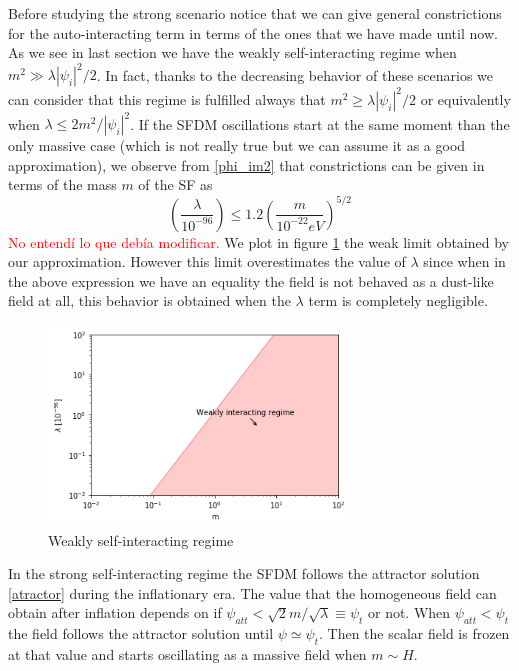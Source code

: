 \documentclass[amssymb,twocolumn,prd,nofootinbib,showpacs]{revtex4-1}
\begin{document}
Before studying the strong scenario notice that we can give general constrictions for the auto-interacting term in terms of the ones that we have made until now. As we see in last section we have the weakly self-interacting regime when $m^2\gg \lambda|\psi_i|^2/2$. In fact, thanks to the decreasing behavior of these scenarios we can consider that this regime is fulfilled always that $m^2\geq \lambda|\psi_i|^2/2$ or equivalently when $\lambda\leq 2m^2/|\psi_i|^2$. If the SFDM oscillations start at the same moment than the only massive case (which is not really true but we can assume it as a good approximation), we observe from \eqref{phi_im2} that constrictions can be given in terms of the mass $m$ of the SF as
\begin{equation}
\left(\frac{\lambda}{10^{-96}}\right)\leq 1.2\left(\frac{m}{10^{-22}eV}\right)^{5/2}
\end{equation}
\textcolor{red}{No entend\'i lo que deb\'ia modificar.} We plot in figure \ref{weekregime} the weak limit obtained by our approximation. However this limit overestimates the value of $\lambda$ since when in the above expression we have an equality the field is not behaved as a dust-like field at all, this behavior is obtained when the $\lambda$ term is completely negligible.
\begin{figure}
\includegraphics[width=8cm]{weakregime.png}
\caption{Weakly self-interacting regime}
\label{weekregime}
\end{figure} 

In the strong self-interacting regime the SFDM follows the attractor solution \eqref{atractor} during the inflationary era.
The value that the homogeneous field can obtain after inflation depends on if $\psi_{att}<\sqrt{2}m/\sqrt{\lambda}\equiv \psi_t$ or not. When $\psi_{att}<\psi_t$ the field follows the attractor solution until $\psi\simeq \psi_t$. Then the scalar field is frozen at that value and starts oscillating as a massive field when $m\sim H$. 
\end{document}

